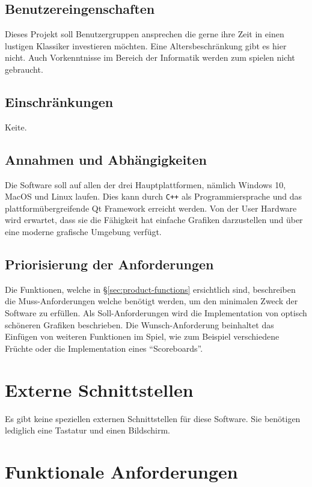 \documentclass[a4paper, twosided, 11pt]{scrartcl}
\begin{document}
\subsection{Benutzereingenschaften}
Dieses Projekt soll Benutzergruppen ansprechen die gerne ihre Zeit in einen
lustigen Klassiker investieren möchten. Eine Altersbeschränkung gibt es hier
nicht. Auch Vorkenntnisse im Bereich der Informatik werden zum spielen nicht
gebraucht.

\subsection{Einschr\"ankungen}
Keite.

\subsection{Annahmen und Abh\"angigkeiten}
Die Software soll auf allen der drei Hauptplattformen, nämlich Windows 10,
MacOS und Linux laufen. Dies kann durch \texttt{C++} als Programmiersprache und
das plattformübergreifende Qt Framework erreicht werden. Von der User Hardware
wird erwartet, dass sie die Fähigkeit hat einfache Grafiken darzustellen und
über eine moderne grafische Umgebung verfügt.

\subsection{Priorisierung der Anforderungen}
Die Funktionen, welche in \S\ref{sec:product-functions} ersichtlich sind,
beschreiben die Muss-Anforderungen welche benötigt werden, um den minimalen
Zweck der Software zu erfüllen. Als Soll-Anforderungen wird die Implementation
von optisch schöneren Grafiken beschrieben.  Die Wunsch-Anforderung beinhaltet
das Einfügen von weiteren Funktionen im Spiel, wie zum Beispiel verschiedene
Früchte oder die Implementation eines ``Scoreboards''.

\section{Externe Schnittstellen}
Es gibt keine speziellen externen Schnittstellen für diese Software. Sie
benötigen lediglich eine Tastatur und einen Bildschirm. 

\section{Funktionale Anforderungen}
\end{document}
